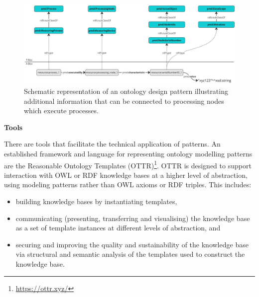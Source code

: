 \begin{figure}[!h]
 \centering
 \includegraphics[width=1\textwidth]{fig/Ontology_Design_Pattern_Processes_Extension.jpg}
 \caption{Schematic representation of an ontology design pattern illustrating additional information that can be connected to processing nodes which execute processes.}
 \label{fig:ontology_design_pattern_process_extension}
\end{figure}

\textbf{Tools}

There are tools that facilitate the technical application of patterns.
An established framework and language for representing ontology modelling patterns are the Reasonable Ontology Templates (OTTR)\footnote{\url{https://ottr.xyz/}}. OTTR is designed to support interaction with OWL or RDF knowledge bases at a higher level of abstraction, using modeling patterns rather than OWL axioms or RDF triples. This includes:
\begin{itemize}
    \item building knowledge bases by instantiating templates,
    \item communicating (presenting, transferring and visualising) the knowledge base as a set of template instances at different levels of abstraction, and
    \item securing and improving the quality and sustainability of the knowledge base via structural and semantic analysis of the templates used to construct the knowledge base.
\end{itemize}

